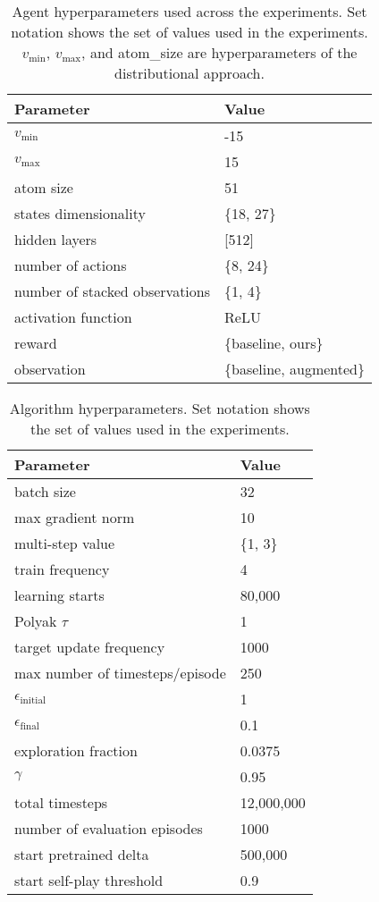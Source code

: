 \documentclass[11pt]{article}
\begin{document}
\begin{table}[H]
    \centering
    \caption{Agent hyperparameters used across the experiments. Set notation shows the set of values used in the experiments. $v_\text{min}$, $v_\text{max}$, and atom\_size are hyperparameters of the distributional approach.}
    \begin{tabular}{ll}
    \toprule
    \textbf{Parameter} & \textbf{Value} \\
    \midrule
    $v_\text{min}$ & -15 \\
    $v_\text{max}$ & 15 \\
    atom size & 51 \\
    states dimensionality & \{18, 27\} \\
    hidden layers & [512] \\
    number of actions & \{8, 24\} \\
    number of stacked observations & \{1, 4\} \\
    activation function & ReLU \\
    reward & \{baseline, ours\} \\
    observation & \{baseline, augmented\} \\
    \bottomrule
    \end{tabular}
\end{table}

\begin{table}[H]
    \centering
    \caption{Algorithm hyperparameters. Set notation shows the set of values used in the experiments.}
    \begin{tabular}{ll}
    \toprule
    \textbf{Parameter} & \textbf{Value} \\
    \midrule
    batch size & 32 \\
    max gradient norm & 10 \\
    multi-step value & \{1, 3\} \\
    train frequency & 4 \\
    learning starts & 80,000 \\
    Polyak $\tau$ & 1 \\
    target update frequency & 1000 \\
    max number of timesteps/episode & 250 \\
    $\epsilon_\text{initial}$ & 1 \\
    $\epsilon_\text{final}$ & 0.1 \\
    exploration fraction & 0.0375 \\
    $\gamma$ & 0.95 \\
    total timesteps & 12,000,000 \\
    number of evaluation episodes & 1000 \\
    start pretrained delta & 500,000 \\
    start self-play threshold & 0.9 \\
    \bottomrule
    \end{tabular}
\end{table}
\end{document}
